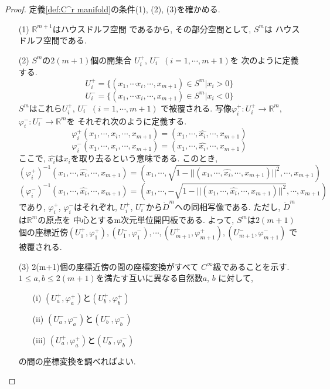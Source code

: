 \documentclass[a4j,12pt]{jarticle}
\theoremstyle{definition}
\begin{document}
\begin{proof}
    定義\ref{def:C^r manifold}の条件(1), (2), (3)を確かめる. 
    \begin{itemize}
        \item[(1)]$\mathbb{R}^{m+1}$はハウスドルフ空間
        であるから, その部分空間として, $S^m$は
        ハウスドルフ空間である. 
        \item[(2)]$S^m$の$2(m+1)$個の開集合
        $U_i^+$, $U_i^-$ $(i=1,\cdots ,m+1)$を
        次のように定義する. 
        $$U_i^+ = \{(x_1, \cdots x_i, \cdots ,x_{m+1})\in S^m|x_i>0\}$$
        $$U_i^- = \{(x_1, \cdots x_i, \cdots ,x_{m+1})\in S^m|x_i<0\}$$
        $S^m$はこれら$U_i^+$, $U_i^-$ $(i=1,\cdots ,m+1)$
        で被覆される. 写像$\varphi_i^+:U_i^+ \rightarrow \mathbb{R}^m$, 
        $\varphi_i^-:U_i^- \rightarrow \mathbb{R}^m$を
        それぞれ次のように定義する. 
        $$\varphi_i^+(x_1,\cdots ,x_i,\cdots, x_{m+1})=(x_1,\cdots ,\hat{x_i},\cdots ,x_{m+1})$$
        $$\varphi_i^-(x_1,\cdots ,x_i,\cdots, x_{m+1})=(x_1,\cdots ,\hat{x_i},\cdots ,x_{m+1})$$
        ここで, $\hat{x_i}$は$x_i$を取り去るという意味である. このとき, 
        $$(\varphi_i^+)^{-1}(x_1,\cdots ,\hat{x_i},\cdots ,x_{m+1})=(x_1,\cdots ,\sqrt{1-||(x_1,\cdots ,\hat{x_i},\cdots ,x_{m+1})||^2},\cdots ,x_{m+1})$$
        $$(\varphi_i^-)^{-1}(x_1,\cdots ,\hat{x_i},\cdots ,x_{m+1})=(x_1,\cdots ,-\sqrt{1-||(x_1,\cdots ,\hat{x_i},\cdots ,x_{m+1})||^2},\cdots ,x_{m+1})$$
        であり, $\varphi_i^+$, $\varphi_i^-$はそれぞれ, $U_i^+$, 
        $U_i^-$から$\mathring{D}^m$への同相写像である.
        ただし, $\mathring{D}^m$は$\mathbb{R}^m$の原点を
        中心とするm次元単位開円板である. 
        よって, $S^m$は$2(m+1)$個の座標近傍$(U_1^+,\varphi_1^+),
        (U_1^-,\varphi_1^-),\cdots ,(U_{m+1}^+,\varphi_{m+1}^+),(U_{m+1}^-,\varphi_{m+1}^-)$
        で被覆される. 
        \item[(3)]2(m+1)個の座標近傍の間の座標変換がすべて
        $C^{\infty}$級であることを示す. \\
        $1\leq a, b\leq 2(m+1)$を満たす互いに異なる自然数$a$, $b$
        に対して, 
        \begin{itemize}
            \item[(i)]$(U_a^+,\varphi_a^+)$と$(U_b^+,\varphi_b^+)$
            \item[(ii)]$(U_a^-,\varphi_a^-)$と$(U_b^-,\varphi_b^-)$
            \item[(iii)] $(U_a^+,\varphi_a^+)$と$(U_b^-,\varphi_b^-)$ 
        \end{itemize}
        の間の座標変換を調べればよい. \\

\end{itemize}
\end{proof}
\end{document}
